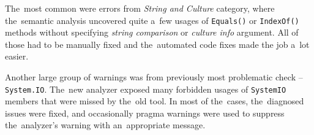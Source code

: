 \documentclass[
  digital, %
  table,   %
  lof,     %
  lot,     %
  oneside,
]{fithesis3}
\begin{document}
The~most common were errors from \textit{String and Culture} category, where the~semantic analysis uncovered quite a~few usages of \texttt{Equals()} or \texttt{IndexOf()} methods without specifying \textit{string comparison} or \textit{culture info} argument. All of those had to be manually fixed and the~automated code fixes made the job a~lot easier.

Another large group of warnings was from previously most problematic check -- \texttt{System.IO}. The~new analyzer exposed many forbidden usages of \texttt{SystemIO} members that were missed by the~old tool. In most of the~cases, the~diagnosed issues were fixed, and occasionally pragma warnings were used to suppress the~analyzer's warning with an~appropriate message.
\end{document}
